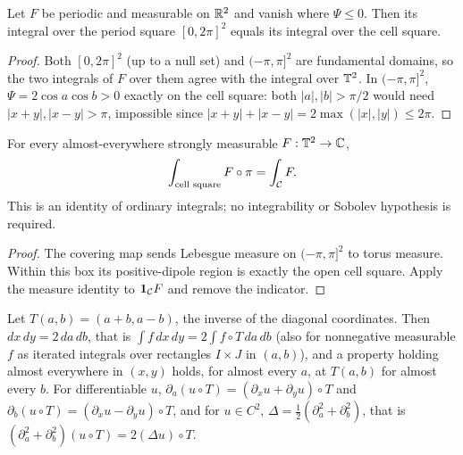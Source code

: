 \begin{lemma}
\label{lem:cell-periodic-integral}
\leanok
Let $F$ be periodic and measurable on $\mathbb{R}^2$ and vanish where $\Psi\le0$. Then its integral
over the period square $[0,2\pi]^2$ equals its integral over the cell square.
\end{lemma}

\begin{proof}
\leanok
Both $[0,2\pi]^2$ (up to a null set) and $(-\pi,\pi]^2$ are fundamental domains, so the two
integrals of $F$ over them agree with the integral over $\mathbb{T}^2$. In $(-\pi,\pi]^2$,
$\Psi=2\cos a\cos b>0$ exactly on the cell square: both $|a|,|b|>\pi/2$ would need
$|x+y|,|x-y|>\pi$, impossible since $|x+y|+|x-y|=2\max(|x|,|y|)\le2\pi$.
\end{proof}

\begin{lemma}
\label{lem:cell-lift-integral}
\leanok
For every almost-everywhere strongly measurable $F:\mathbb{T}^2\to\mathbb{C}$,
\[
 \int_{\text{cell square}}F\circ\pi=\int_{\mathcal{C}} F.
\]
This is an identity of ordinary integrals; no integrability or Sobolev
hypothesis is required.
\end{lemma}

\begin{proof}
\leanok
The covering map sends Lebesgue measure on $(-\pi,\pi]^2$ to torus measure.
Within this box its positive-dipole region is exactly the open cell square.
Apply the measure identity to $\mathbf1_{\mathcal{C}} F$ and remove the indicator.
\end{proof}

\begin{lemma}
\label{lem:diagonal-calculus}
\leanok
Let $T(a,b)=(a+b,a-b)$, the inverse of the diagonal coordinates. Then
$dx\,dy=2\,da\,db$, that is $\int f\,dx\,dy=2\int f\circ T\,da\,db$ (also for
nonnegative measurable $f$ as iterated integrals over rectangles $I\times J$ in $(a,b)$), and a
property holding almost everywhere in $(x,y)$ holds, for almost every $a$, at $T(a,b)$ for
almost every $b$. For
differentiable $u$, $\partial_a(u\circ T)=(\partial_xu+\partial_yu)\circ T$ and
$\partial_b(u\circ T)=(\partial_xu-\partial_yu)\circ T$, and for $u\in C^2$,
$\Delta=\tfrac12(\partial_a^2+\partial_b^2)$, that is
$(\partial_a^2+\partial_b^2)(u\circ T)=2(\Delta u)\circ T$.
\end{lemma}

